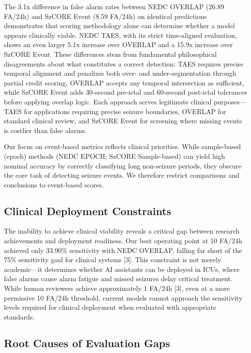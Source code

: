The 3.1x difference in false alarm rates between NEDC OVERLAP (26.89
FA/24h) and SzCORE Event (8.59 FA/24h) on identical predictions
demonstrates that scoring methodology alone can determine whether a
model appears clinically viable. NEDC TAES, with its strict time-aligned
evaluation, shows an even larger 5.1x increase over OVERLAP and a 15.9x
increase over SzCORE Event. These differences stem from fundamental
philosophical disagreements about what constitutes a correct detection:
TAES requires precise temporal alignment and penalizes both over- and
under-segmentation through partial credit scoring, OVERLAP accepts any
temporal intersection as sufficient, while SzCORE Event adds 30-second
pre-ictal and 60-second post-ictal tolerances before applying overlap
logic. Each approach serves legitimate clinical purposes---TAES for
applications requiring precise seizure boundaries, OVERLAP for standard
clinical review, and SzCORE Event for screening where missing events is
costlier than false alarms.

Our focus on event-based metrics reflects clinical priorities. While
sample-based (epoch) methods (NEDC EPOCH; SzCORE Sample-based) can yield
high nominal accuracy by correctly classifying long non-seizure periods,
they obscure the core task of detecting seizure events. We therefore
restrict comparisons and conclusions to event-based scores.

\hypertarget{clinical-deployment-constraints}{%
\subsection{Clinical Deployment
Constraints}\label{clinical-deployment-constraints}}

The inability to achieve clinical viability reveals a critical gap
between research achievements and deployment readiness. Our best
operating point at 10 FA/24h achieved only 33.90\% sensitivity with NEDC
OVERLAP, falling far short of the 75\% sensitivity goal for clinical
systems {[}3{]}. This constraint is not merely academic---it determines
whether AI assistants can be deployed in ICUs, where false alarms cause
alarm fatigue and missed seizures delay critical treatment. While human
reviewers achieve approximately 1 FA/24h {[}3{]}, even at a more
permissive 10 FA/24h threshold, current models cannot approach the
sensitivity levels required for clinical deployment when evaluated with
appropriate standards.

\hypertarget{root-causes-of-evaluation-gaps}{%
\subsection{Root Causes of Evaluation
Gaps}\label{root-causes-of-evaluation-gaps}}

